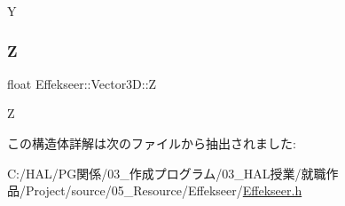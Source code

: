 Y 

\mbox{\label{struct_effekseer_1_1_vector3_d_aa73821e922d235f82cfb3d8eab43901a}} 
\subsubsection{\texorpdfstring{Z}{Z}}
{\footnotesize\ttfamily float Effekseer\+::\+Vector3\+D\+::Z}



Z 



この構造体詳解は次のファイルから抽出されました\+:\begin{DoxyCompactItemize}
\item 
C\+:/\+H\+A\+L/\+P\+G関係/03\+\_\+作成プログラム/03\+\_\+\+H\+A\+L授業/就職作品/\+Project/source/05\+\_\+\+Resource/\+Effekseer/\mbox{\hyperlink{_effekseer_8h}{Effekseer.\+h}}\end{DoxyCompactItemize}
